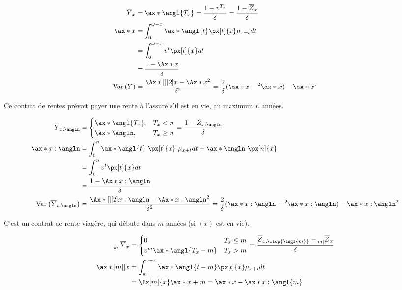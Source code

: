 \documentclass[10pt, french]{article}
\begin{document}
\begin{multicols*}{3}
\begin{definitionNOHFILLsub}
\begin{align*}
	\overline{Y}_{x}	
	&=	\ax*{\angl{T_{x}}} = \frac{1-v^{T_x}}{\delta} = \frac{1 -\overline{Z}_x}{\delta} \\
\ax*{x} 
	&=	\int_{0}^{\omega - x}  \ax*{\angl{t}}  \px[t]{x} \mu_{x+t} dt \\
	&=	\int_{0}^{\omega - x} v^t \px[t]{x} dt \\
	&=	\frac{1 - \Ax*{x}}{\delta} \\
\variance{Y}	 
	&=	\frac{\Ax*[][2]{x} - \Ax*{x}^2}{\delta^2} 
	=	\frac{2}{\delta} (\ax*{x} - \prescript{2}{}{\ax*{x}}) - \ax*{x}^2
\end{align*}
\end{definitionNOHFILLsub}


\begin{definitionNOHFILLsub}
Ce contrat de rentes prévoit payer une rente à l'assuré s'il est en vie, au maximum $n$ années.

\begin{align*}
	\overline{Y}_{x:\angln} 
	&=	\begin{cases}
			\ax*{\angl{T_x}}	,	&	T_x < n \\
			\ax*{\angln},		&	T_x \geq n \\
		\end{cases} 
	=	\frac{1  - \overline{Z}_{x:\angln}}{\delta} \\
	\ax*{x:\angln}	
	&=	\int_{0}^{n} \ax*{\angl{t}} \  \px[t]{x} \  \mu_{x+t} dt + \ax*{\angln} \ \px[n]{x} \\
	&=	\int_{0}^{n} v^t \px[t]{x} dt \\
	&=	\frac{1 - \Ax*{x:\angln}}{\delta} \\
\variance{\overline{Y}_{x:\angln}}	
	&=	\frac{\Ax*[][2]{x:\angln} - \Ax*{x:\angln}^2}{\delta^2} 
	=	\frac{2}{\delta} (\ax*{x:\angln} - \prescript{2}{}{\ax*{x:\angln}}) - \ax*{x:\angln}^2
\end{align*}
\end{definitionNOHFILLsub}


\begin{definitionNOHFILLsub}
C'est un contrat de rente viagère, qui débute dans $m$ années (si $(x)$ est en vie).

\begin{align*}
	\prescript{}{m|}{\overline{Y}}_{x} 
	&=	\begin{cases}
			0						& T_x \leq m	\\
			v^m \ax*{\angl{T_x - m}}	& T_x > m	\\
		\end{cases} 
	=	\frac{\overline{Z}_{x:\itop{\angl{m}}} - \prescript{}{m|}{\overline{Z}}_{x}}{\delta} \\ 
	\ax*[m|]{x}	
	&=	\int_{m}^{\omega - x} \ax*{\angl{t - m}} \px[t]{x} \mu_{x+t} dt \\
	&=	\Ex[m]{x} \ax*{x+m} 
	=	\ax*{x} - \ax*{x:\angl{m}} 
\end{align*}


\end{definitionNOHFILLsub}
\end{multicols*}
\end{document}
